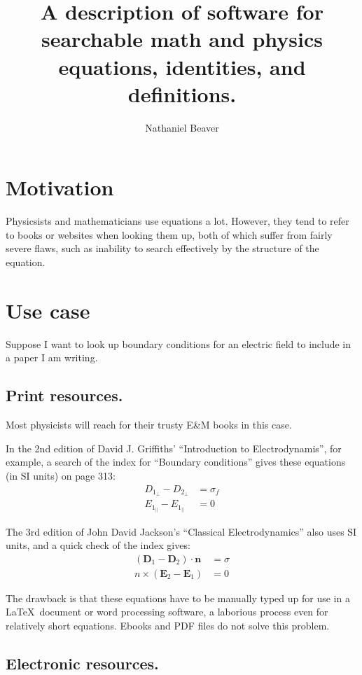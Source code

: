 \documentclass[12pt,letterpaper]{article}
\author{Nathaniel Beaver}
\title{A description of software for searchable math and physics equations, identities, and definitions.}
\begin{document}
\maketitle

\section{Motivation}

Physicsists and mathematicians use equations a lot. However, they tend to refer to books or websites when looking them up, both of which suffer from fairly severe flaws, such as inability to search effectively by the structure of the equation.

\section{Use case}

Suppose I want to look up boundary conditions for an electric field to include in a paper I am writing.

\subsection{Print resources.}

Most physicists will reach for their trusty E\&M books in this case.

In the 2nd edition of David J. Griffiths' ``Introduction to Electrodynamis'', for example, a search of the index for ``Boundary conditions'' gives these equations (in SI units) on page 313:
\begin{align*}
D_{1_\bot} - D_{2_\bot} &= \sigma_f \\
E_{1_\parallel} - E_{1_\parallel} &= 0
\end{align*}

The 3rd edition of John David Jackson's ``Classical Electrodynamics'' also uses SI units, and a quick check of the index gives:
\begin{align*}
(\mathbf{D}_1 - \mathbf{D}_2)\cdot \mathbf{n} &= \sigma \\
n \times (\mathbf{E}_2 - \mathbf{E}_1) &= 0
\end{align*}

The drawback is that these equations have to be manually typed up for use in a \LaTeX\ document or word processing software, a laborious process even for relatively short equations. Ebooks and PDF files do not solve this problem.

\subsection{Electronic resources.}
\end{document}

